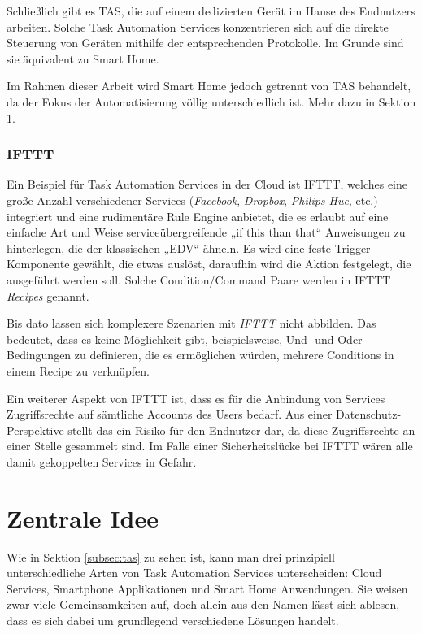 Schließlich gibt es TAS, die auf einem dedizierten Gerät im Hause des Endnutzers arbeiten. Solche Task Automation Services konzentrieren sich auf die direkte Steuerung von Geräten mithilfe der entsprechenden Protokolle. Im Grunde sind sie äquivalent zu Smart Home. 

Im Rahmen dieser Arbeit wird Smart Home jedoch getrennt von TAS behandelt, da der Fokus der Automatisierung völlig unterschiedlich ist. Mehr dazu in Sektion \ref{sec:idee}.



\subsubsection{IFTTT}
Ein Beispiel für Task Automation Services in der Cloud ist IFTTT, welches eine große Anzahl verschiedener Services (\textit{Facebook}, \textit{Dropbox}, \textit{Philips Hue}\cite{hue},   etc.) integriert und eine rudimentäre Rule Engine anbietet, die es erlaubt auf eine einfache Art und Weise serviceübergreifende „if this than that“ Anweisungen zu hinterlegen, die der klassischen „EDV“ ähneln. Es wird eine feste Trigger Komponente gewählt, die etwas auslöst, daraufhin wird die Aktion festgelegt, die ausgeführt werden soll. Solche Condition/Command Paare werden in IFTTT \textit{Recipes} genannt. 

Bis dato lassen sich komplexere Szenarien mit \textit{IFTTT} nicht abbilden.  Das bedeutet, dass es keine Möglichkeit gibt, beispielsweise, Und- und Oder-Bedingungen zu definieren, die es ermöglichen würden, mehrere Conditions in einem Recipe zu verknüpfen.

Ein weiterer Aspekt von IFTTT ist, dass es für die Anbindung von Services Zugriffsrechte auf sämtliche Accounts des Users bedarf. Aus einer Datenschutz-Perspektive\cite{cloudsec} stellt das ein Risiko für den Endnutzer dar, da diese Zugriffsrechte an einer Stelle gesammelt sind. Im Falle einer Sicherheitslücke bei IFTTT wären alle damit gekoppelten Services in Gefahr. 

\section{Zentrale Idee}
\label{sec:idee}
Wie in Sektion \ref{subsec:tas} zu sehen ist, kann man drei prinzipiell unterschiedliche Arten von Task Automation Services unterscheiden: Cloud Services, Smartphone Applikationen und Smart Home Anwendungen. Sie weisen zwar viele Gemeinsamkeiten auf, doch allein aus den Namen lässt sich ablesen, dass es sich dabei um grundlegend verschiedene Lösungen handelt. 

